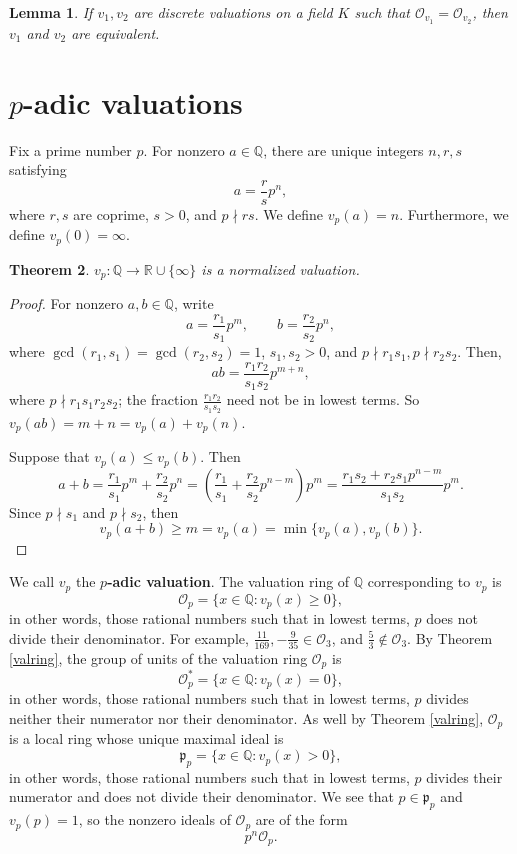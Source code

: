 \documentclass{article}
\newtheorem{theorem}{Theorem}
\newtheorem{lemma}[theorem]{Lemma}
\theoremstyle{definition}
\begin{document}
\begin{lemma}
If $v_1,v_2$ are discrete valuations on a field $K$ such that $\mathcal{O}_{v_1}=\mathcal{O}_{v_2}$, then 
$v_1$ and $v_2$ are equivalent. 
\end{lemma}


\section{$p$-adic valuations}
Fix a prime number $p$. For nonzero $a \in \mathbb{Q}$, there are unique integers $n,r,s$ satisfying
\[
a=\frac{r}{s}p^n,
\]
where $r,s$ are coprime, $s>0$, and $p \nmid rs$. 
We define $v_p(a)=n$. 
Furthermore, we define $v_p(0)=\infty$. 


\begin{theorem}
$v_p:\mathbb{Q} \to \mathbb{R} \cup \{\infty\}$ is a normalized valuation.
\end{theorem}
\begin{proof}
For nonzero $a,b \in \mathbb{Q}$,
write
\[
a=\frac{r_1}{s_1} p^m, \qquad b = \frac{r_2}{s_2}p^n,
\]
where $\gcd(r_1,s_1)=\gcd(r_2,s_2)=1$, $s_1,s_2>0$, and $p
\nmid r_1s_1, p \nmid r_2s_2$. Then,
\[
ab = \frac{r_1r_2}{s_1s_2} p^{m+n},
\]
where $p \nmid r_1s_1r_2s_2$; the fraction $\frac{r_1r_2}{s_1s_2}$ need not be in lowest terms. 
So $v_p(ab)=m+n=v_p(a)+v_p(n)$.

Suppose that $v_p(a) \leq   v_p(b)$. Then
\[
a+b = \frac{r_1}{s_1} p^m +  \frac{r_2}{s_2}p^n
= \left( \frac{r_1}{s_1} +\frac{r_2}{s_2} p^{n-m}\right)p^m
=\frac{r_1s_2+r_2s_1p^{n-m}}{s_1s_2} p^m.
\]
Since $p \nmid s_1$ and $p \nmid s_2$, 
then
\[
v_p(a+b) \geq m = v_p(a) = \min\{v_p(a),v_p(b)\}.
\]
\end{proof}

We call $v_p$ the \textbf{$p$-adic valuation}.
The valuation ring of $\mathbb{Q}$ corresponding to  $v_p$ is
\[
\mathcal{O}_p = \{x \in \mathbb{Q}: v_p(x) \geq 0\}, 
\]
in other words, those rational numbers such that in lowest terms, $p$ does not divide their denominator. For example,
$\frac{11}{169}, -\frac{9}{35} \in \mathcal{O}_3$, and $\frac{5}{3} \not \in \mathcal{O}_3$. 
By Theorem \ref{valring}, the group of units of the valuation ring $\mathcal{O}_p$ is
\[
\mathcal{O}_p^*= \{x \in \mathbb{Q}: v_p(x)=0\},
\]
in other words, those rational numbers such that in lowest terms, $p$ divides neither their numerator nor their denominator. 
As well by Theorem \ref{valring}, $\mathcal{O}_p$ is a local ring whose unique maximal ideal is
\[
\mathfrak{p}_p = \{x \in \mathbb{Q}: v_p(x)>0\},
\]
in other words, those rational numbers such that in lowest terms, $p$ divides their numerator and does not divide their
denominator. 
We see that $p \in \mathfrak{p}_p$ and $v_p(p)=1$, so the nonzero ideals of $\mathcal{O}_p$ are of the form
\[
p^n \mathcal{O}_p.
\]
\end{document}
